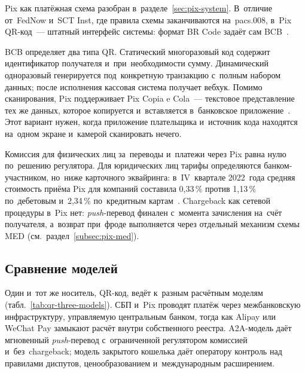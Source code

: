Pix как платёжная схема разобран в~разделе~\ref{sec:pix-system}. В~отличие
от~FedNow и~SCT Inst, где правила схемы заканчиваются на~pacs.008, в~Pix
QR-код~--- штатный интерфейс системы: формат BR Code задаёт сам
BCB~\cite{pix-manual-iniciacao}.

BCB определяет два типа QR. Статический многоразовый код содержит идентификатор
получателя и~при~необходимости сумму. Динамический одноразовый генерируется
под~конкретную транзакцию с~полным набором данных; после исполнения кассовая
система получает вебхук. Помимо сканирования, Pix поддерживает Pix
Copia e Cola~--- текстовое представление тех же данных, которое копируется
и~вставляется в~банковское приложение~\cite{pix-faq}. Этот вариант нужен, когда
приложение плательщика и~источник кода находятся на~одном экране и~камерой
сканировать нечего.

Комиссия для физических лиц за~переводы и~платежи через Pix равна нулю
по~решению регулятора. Для юридических лиц тарифы определяются
банком-участником, но~ниже карточного эквайринга: в~IV~квартале 2022~года
средняя стоимость приёма Pix для компаний составила 0{,}33\,\% против 1{,}13\,\%
по~дебетовым и~2{,}34\,\% по~кредитным картам~\cite{bcb-pix-relatorio-gestao-2023}. Chargeback как
сетевой процедуры в~Pix нет: \textit{push}-перевод финален с~момента зачисления
на~счёт получателя, а~возврат при~фроде выполняется через отдельный механизм
схемы MED (см.~раздел~\ref{subsec:pix-med}).

\subsection*{Сравнение моделей}

Один и~тот же носитель, QR-код, ведёт к~разным расчётным моделям
(табл.~\ref{tab:qr-three-models}). СБП и~Pix проводят платёж через
межбанковскую инфраструктуру, управляемую центральным банком, тогда как Alipay
или WeChat Pay замыкают расчёт внутри собственного реестра. A2A-модель даёт
мгновенный \textit{push}-перевод с~ограниченной регулятором комиссией
и~без~chargeback; модель закрытого кошелька даёт оператору контроль
над правилами диспутов, ценообразованием и~международным расширением.

